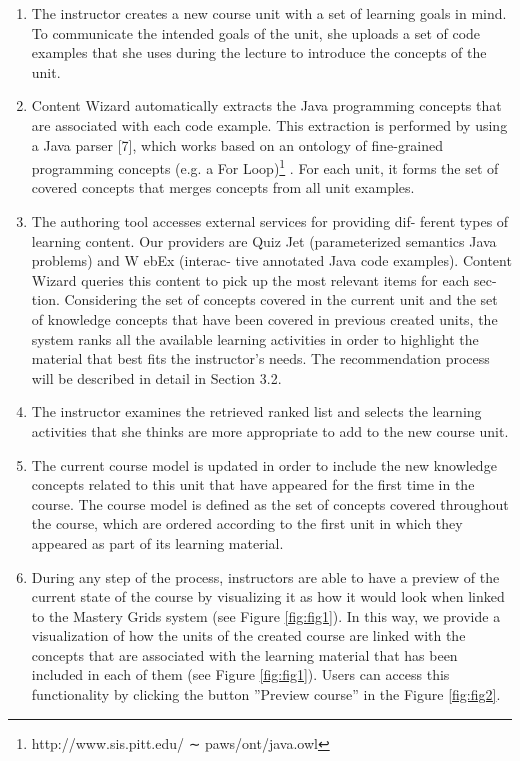 \documentclass{sig-alternate}
\begin{document}
\begin{enumerate}
  \item The instructor creates a new course unit with a set of learning
goals in mind. To communicate the intended goals of the unit,
she uploads a set of code examples that she uses during the
lecture to introduce the concepts of the unit.
  \item Content Wizard automatically extracts the Java programming
concepts that are associated with each code example. This
extraction is performed by using a Java parser [7], which works
based on an ontology of fine-grained programming concepts
(e.g. a For Loop)\footnote{http://www.sis.pitt.edu/ ∼ paws/ont/java.owl} . For each unit, it forms the set of covered
concepts that merges concepts from all unit examples.
\item The authoring tool accesses external services for providing dif-
ferent types of learning content. Our providers are Quiz Jet (parameterized semantics Java problems) and W ebEx (interac-
tive annotated Java code examples). Content Wizard queries
this content to pick up the most relevant items for each sec-
tion. Considering the set of concepts covered in the current
unit and the set of knowledge concepts that have been covered
in previous created units, the system ranks all the available
learning activities in order to highlight the material that best
fits the instructor’s needs. The recommendation process will
be described in detail in Section 3.2.
\item The instructor examines the retrieved ranked list and selects
the learning activities that she thinks are more appropriate to
add to the new course unit.
\item The current course model is updated in order to include the
new knowledge concepts related to this unit that have appeared
for the first time in the course. The course model is defined as
the set of concepts covered throughout the course, which are
ordered according to the first unit in which they appeared as
part of its learning material.
\item During any step of the process, instructors are able to have a
preview of the current state of the course by visualizing it as
how it would look when linked to the Mastery Grids system
(see Figure \ref{fig:fig1}). In this way, we provide a visualization of how
the units of the created course are linked with the concepts
that are associated with the learning material that has been
included in each of them (see Figure \ref{fig:fig1}). Users can access this
functionality by clicking the button ”Preview course” in the
Figure \ref{fig:fig2}.
\end{enumerate}
\end{document}
